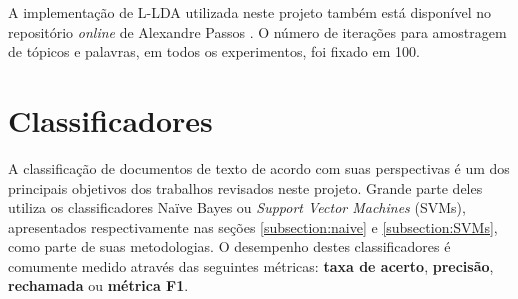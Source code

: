 
A implementação de L-LDA utilizada neste projeto também está disponível no repositório \emph{online} de Alexandre Passos \cite{top-llda}. O número de iterações para amostragem de tópicos e palavras, em todos os experimentos, foi fixado em 100.








\section{Classificadores}

A classificação de documentos de texto de acordo com suas perspectivas é um dos principais objetivos dos trabalhos revisados neste projeto. Grande parte deles utiliza os classificadores Naïve Bayes ou \emph{Support Vector Machines} (SVMs), apresentados respectivamente nas seções \ref{subsection:naive} e \ref{subsection:SVMs}, como parte de suas metodologias. O desempenho destes classificadores é comumente medido através das seguintes métricas: \textbf{taxa de acerto}, \textbf{precisão}, \textbf{rechamada} ou \textbf{métrica F1}.

